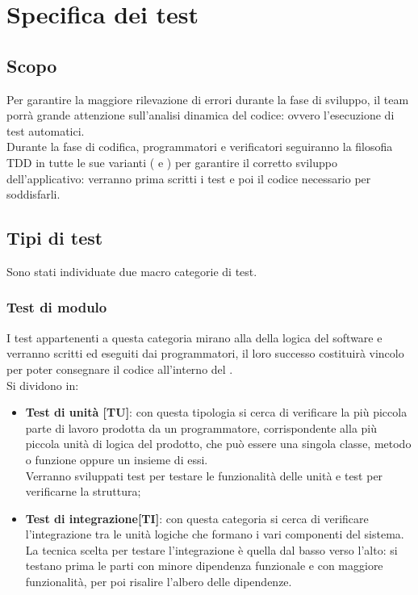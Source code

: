 \documentclass[PianoDiProgetto.tex]{subfiles}
\begin{document}
\chapter{Specifica dei test}

\section{Scopo}
Per garantire la maggiore rilevazione di errori durante la fase di sviluppo, il team porrà grande attenzione sull'analisi dinamica del codice: ovvero l'esecuzione di test automatici. \\
Durante la fase di codifica, programmatori e verificatori seguiranno la filosofia TDD in tutte le sue varianti ( e ) per garantire il corretto sviluppo dell'applicativo: verranno prima scritti i test e poi il codice necessario per soddisfarli.

\section{Tipi di test}
Sono stati individuate due macro categorie di test.

\subsection{Test di modulo}
I test appartenenti a questa categoria mirano alla  della logica del software e verranno scritti ed eseguiti dai programmatori, il loro successo costituirà vincolo per poter consegnare il codice all'interno del . \\
Si dividono in:
\begin{itemize}
	\item \textbf{Test di unità [TU]}: con questa tipologia si cerca di verificare la più piccola parte di lavoro prodotta da un programmatore, corrispondente alla più piccola unità di logica del prodotto, che può essere una singola classe, metodo o funzione oppure un insieme di essi. \\
	Verranno sviluppati test  per testare le funzionalità delle unità e test  per verificarne la struttura;
	\item \textbf{Test di integrazione[TI]}: con questa categoria si cerca di verificare l'integrazione tra le unità logiche che formano i vari componenti del sistema.\\
	La tecnica scelta per testare l'integrazione è quella dal basso verso l'alto: si testano prima le parti con minore dipendenza funzionale e con maggiore funzionalità, per poi risalire l'albero delle dipendenze.\\
\end{itemize}
\end{document}
